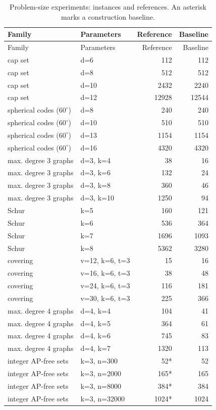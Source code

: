 \begin{longtable}{@{}P{.29\linewidth}P{.38\linewidth}rr@{}}
\caption{Problem-size experiments: instances and references. An asterisk marks a construction baseline.}\label{tab:ladder_parameters}\\
\toprule
Family & Parameters & Reference & Baseline \\
\midrule\endfirsthead
\toprule
Family & Parameters & Reference & Baseline \\
\midrule\endhead
\bottomrule\endfoot
cap set & d=6 & 112 & 112 \\
cap set & d=8 & 512 & 512 \\
cap set & d=10 & 2432 & 2240 \\
cap set & d=12 & 12928 & 12544 \\
spherical codes ($60^\circ$) & d=8 & 240 & 240 \\
spherical codes ($60^\circ$) & d=10 & 510 & 510 \\
spherical codes ($60^\circ$) & d=13 & 1154 & 1154 \\
spherical codes ($60^\circ$) & d=16 & 4320 & 4320 \\
max. degree 3 graphs & d=3, k=4 & 38 & 16 \\
max. degree 3 graphs & d=3, k=6 & 132 & 24 \\
max. degree 3 graphs & d=3, k=8 & 360 & 46 \\
max. degree 3 graphs & d=3, k=10 & 1250 & 94 \\
Schur & k=5 & 160 & 121 \\
Schur & k=6 & 536 & 364 \\
Schur & k=7 & 1696 & 1093 \\
Schur & k=8 & 5362 & 3280 \\
covering & v=12, k=6, t=3 & 15 & 16 \\
covering & v=16, k=6, t=3 & 38 & 48 \\
covering & v=24, k=6, t=3 & 116 & 181 \\
covering & v=30, k=6, t=3 & 225 & 366 \\
max. degree 4 graphs & d=4, k=4 & 104 & 41 \\
max. degree 4 graphs & d=4, k=5 & 364 & 61 \\
max. degree 4 graphs & d=4, k=6 & 745 & 83 \\
max. degree 4 graphs & d=4, k=7 & 1320 & 113 \\
integer AP-free sets & k=3, n=300 & 52* & 52 \\
integer AP-free sets & k=3, n=2000 & 165* & 165 \\
integer AP-free sets & k=3, n=8000 & 384* & 384 \\
integer AP-free sets & k=3, n=32000 & 1024* & 1024 \\
\end{longtable}
